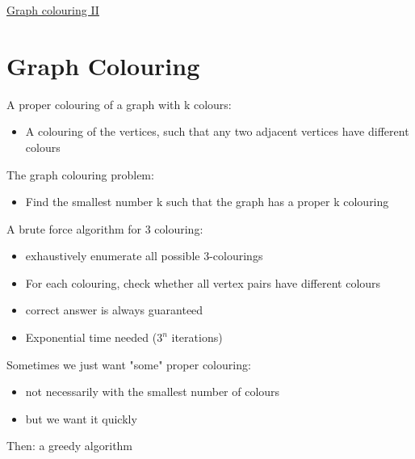 \documentclass{article}[18pt]
\begin{document}
\begin{center}
\underline{\huge Graph colouring II}
\end{center}
\section{Graph Colouring}
A proper colouring of a graph with k colours:
\begin{itemize}
\item A colouring of the vertices, such that any two adjacent vertices have different colours
\end{itemize}
The graph colouring problem:
\begin{itemize}
\item Find the smallest number k such that the graph has a proper k colouring
\end{itemize}
A brute force algorithm for 3 colouring:
\begin{itemize}
\item exhaustively enumerate all possible 3-colourings
\item For each colouring, check whether all vertex pairs have different colours
\item correct answer is always guaranteed
\item Exponential time needed ($3^n$ iterations)
\end{itemize}
Sometimes we just want "some" proper colouring:
\begin{itemize}
\item not necessarily with the smallest number of colours
\item but we want it quickly
\end{itemize}
Then: a greedy algorithm
\end{document}
